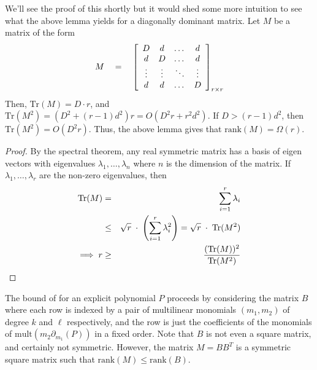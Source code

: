 \documentclass[12pt]{report}
\newcommand{\rank}{\mathrm{rank}}
\begin{document}
We'll see the proof of this shortly but it would shed some more intuition to see what the above lemma yields for a diagonally dominant matrix. Let $M$ be a matrix of the form
\[
M \quad = \quad \left[\begin{array}{cccc}
D &  d & \dots &  d\\
 d & D & \dots & d\\
\vdots & \vdots & \ddots & \vdots \\
d & d & \dots & D
\end{array}\right]_{r \times r}
\]
Then, $\mathrm{Tr}(M) = D\cdot r$, and $\mathrm{Tr}(M^2) = (D^2 + (r-1)d^2)r = O(D^2 r + r^2 d^2)$. If $D > (r-1)d^2$, then $\mathrm{Tr}(M^2) = O(D^2r)$. Thus, the above lemma gives that $\rank(M) = \Omega(r)$. 
\begin{proof}
By the spectral theorem, any real symmetric matrix has a basis of eigen vectors with eigenvalues $\lambda_1,\dots, \lambda_n$ where $n$ is the dimension of the matrix. If $\lambda_1,\dots, \lambda_r$ are the non-zero eigenvalues, then 
\begin{eqnarray*}
\mathrm{Tr}(M) &   =  & \sum_{i=1}^r \lambda_i\\
& \leq & \sqrt{r} \;\cdot \; \left(\sum_{i=1}^r \lambda_i^2\right) = \sqrt{r}\;\cdot \; \mathrm{Tr}(M^2)\\
\implies r & \geq & \frac{(\mathrm{Tr}(M))^2}{\mathrm{Tr}(M^2)}
\end{eqnarray*}
\end{proof}

The bound of \cite{KLSS} for an explicit polynomial $P$ proceeds by considering the matrix $B$ where each row is indexed by a pair of multilinear monomials $(m_1,m_2)$  of degree $k$ and $\ell$ respectively, and the row is just the coefficients of the monomials of $\mathrm{mult}(m_2 \partial_{m_1}(P))$ in a fixed order. Note that $B$ is not even a square matrix, and certainly not symmetric. However, the matrix $M = B B^T$ is a symmetric square matrix such that $\rank(M) \leq \rank(B)$. \\
\end{document}
